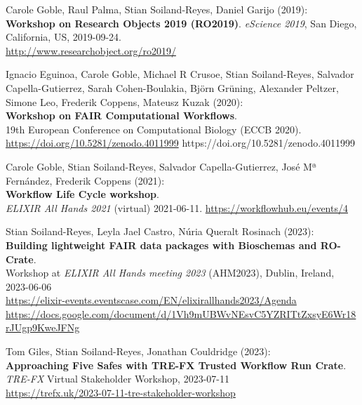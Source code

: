 
Carole Goble, Raul Palma, Stian Soiland-Reyes, Daniel Garijo (2019):\\
\textbf{Workshop on Research Objects 2019 (RO2019)}.
\emph{eScience 2019}, San Diego, California, US, 2019-09-24.\\
\url{http://www.researchobject.org/ro2019/}


Ignacio Eguinoa, Carole Goble, Michael R Crusoe, Stian Soiland-Reyes, Salvador Capella-Gutierrez, Sarah Cohen-Boulakia, Björn Grüning, Alexander Peltzer, Simone Leo, Frederik Coppens, Mateusz Kuzak (2020):\\
\textbf{{Workshop on FAIR Computational Workflows}}.\\
19th European Conference on Computational Biology ({ECCB 2020}).\\
\url{https://doi.org/10.5281/zenodo.4011999}
https://doi.org/10.5281/zenodo.4011999


Carole Goble, Stian Soiland-Reyes, Salvador Capella-Gutierrez, José Mª Fernández, Frederik Coppens (2021):\\
\textbf{Workflow Life Cycle workshop}.\\
\emph{ELIXIR All Hands 2021} (virtual) 2021-06-11.
\url{https://workflowhub.eu/events/4}

Stian Soiland-Reyes, Leyla Jael Castro, Núria Queralt Rosinach (2023):\\
\textbf{Building lightweight FAIR data packages with Bioschemas and RO-Crate}.\\
Workshop at \emph{ELIXIR All Hands meeting 2023} (AHM2023), Dublin, Ireland, 2023-06-06 \\
\url{https://elixir-events.eventscase.com/EN/elixirallhands2023/Agenda}
\url{https://docs.google.com/document/d/1Vh9mUBWvNEsvC5YZRITtZxsyE6Wr18rJUgp9KweJFNg}

Tom Giles, Stian Soiland-Reyes, Jonathan Couldridge (2023):\\
\textbf{Approaching Five Safes with TRE-FX Trusted Workflow Run Crate}.\\
\emph{TRE-FX} Virtual Stakeholder Workshop, 2023-07-11 \\
\url{https://trefx.uk/2023-07-11-tre-stakeholder-workshop}

